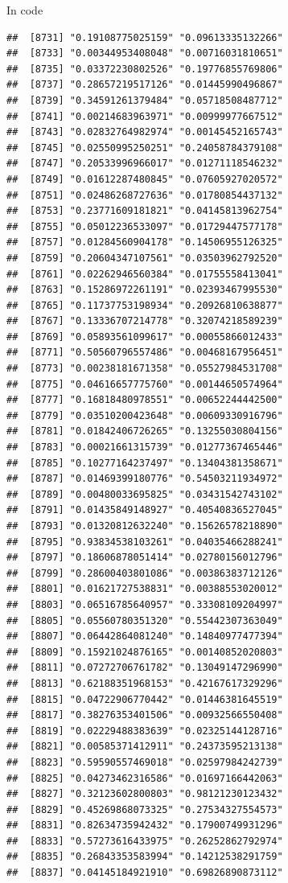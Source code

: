 \documentclass[ignorenonframetext,]{beamer}
\begin{document}
\begin{frame}[fragile]{In code}
\begin{verbatim}
##  [8731] "0.19108775025159" "0.09613335132266"
##  [8733] "0.00344953408048" "0.00716031810651"
##  [8735] "0.03372230802526" "0.19776855769806"
##  [8737] "0.28657219517126" "0.01445990496867"
##  [8739] "0.34591261379484" "0.05718508487712"
##  [8741] "0.00214683963971" "0.00999977667512"
##  [8743] "0.02832764982974" "0.00145452165743"
##  [8745] "0.02550995250251" "0.24058784379108"
##  [8747] "0.20533996966017" "0.01271118546232"
##  [8749] "0.01612287480845" "0.07605927020572"
##  [8751] "0.02486268727636" "0.01780854437132"
##  [8753] "0.23771609181821" "0.04145813962754"
##  [8755] "0.05012236533097" "0.01729447577178"
##  [8757] "0.01284560904178" "0.14506955126325"
##  [8759] "0.20604347107561" "0.03503962792520"
##  [8761] "0.02262946560384" "0.01755558413041"
##  [8763] "0.15286972261191" "0.02393467995530"
##  [8765] "0.11737753198934" "0.20926810638877"
##  [8767] "0.13336707214778" "0.32074218589239"
##  [8769] "0.05893561099617" "0.00055866012433"
##  [8771] "0.50560796557486" "0.00468167956451"
##  [8773] "0.00238181671358" "0.05527984531708"
##  [8775] "0.04616657775760" "0.00144650574964"
##  [8777] "0.16818480978551" "0.00652244442500"
##  [8779] "0.03510200423648" "0.00609330916796"
##  [8781] "0.01842406726265" "0.13255030804156"
##  [8783] "0.00021661315739" "0.01277367465446"
##  [8785] "0.10277164237497" "0.13404381358671"
##  [8787] "0.01469399180776" "0.54503211934972"
##  [8789] "0.00480033695825" "0.03431542743102"
##  [8791] "0.01435849148927" "0.40540836527045"
##  [8793] "0.01320812632240" "0.15626578218890"
##  [8795] "0.93834538103261" "0.04035466288241"
##  [8797] "0.18606878051414" "0.02780156012796"
##  [8799] "0.28600403801086" "0.00386383712126"
##  [8801] "0.01621727538831" "0.00388553020012"
##  [8803] "0.06516785640957" "0.33308109204997"
##  [8805] "0.05560780351320" "0.55442307363049"
##  [8807] "0.06442864081240" "0.14840977477394"
##  [8809] "0.15921024876165" "0.00140852020803"
##  [8811] "0.07272706761782" "0.13049147296990"
##  [8813] "0.62188351968153" "0.42167617329296"
##  [8815] "0.04722906770442" "0.01446381645519"
##  [8817] "0.38276353401506" "0.00932566550408"
##  [8819] "0.02229488383639" "0.02325144128716"
##  [8821] "0.00585371412911" "0.24373595213138"
##  [8823] "0.59590557469018" "0.02597984242739"
##  [8825] "0.04273462316586" "0.01697166442063"
##  [8827] "0.32123602800803" "0.98121230123432"
##  [8829] "0.45269868073325" "0.27534327554573"
##  [8831] "0.82634735942432" "0.17900749931296"
##  [8833] "0.57273616433975" "0.26252862792974"
##  [8835] "0.26843353583994" "0.14212538291759"
##  [8837] "0.04145184921910" "0.69826890873112"

\end{verbatim}
\end{frame}
\end{document}
